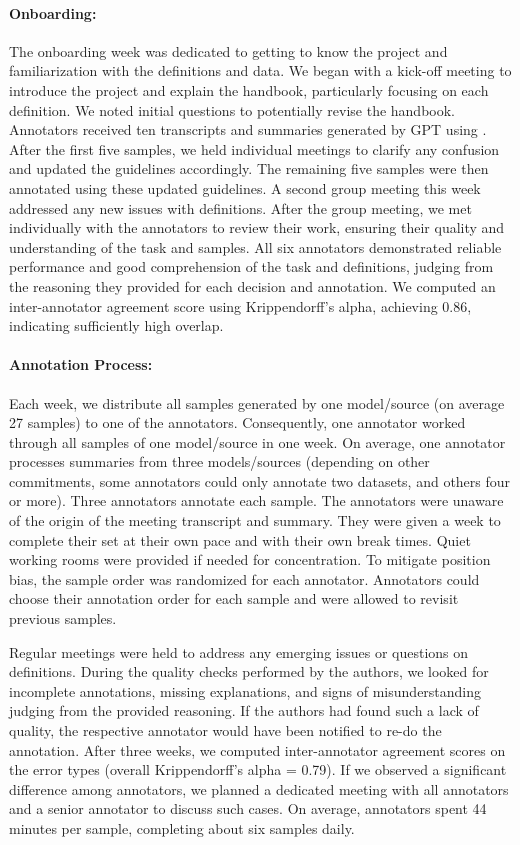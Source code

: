 \paragraph{Onboarding:}
The onboarding week was dedicated to getting to know the project and familiarization with the definitions and data.
We began with a kick-off meeting to introduce the project and explain the handbook, particularly focusing on each definition.
We noted initial questions to potentially revise the handbook. 
Annotators received ten transcripts and summaries generated by GPT \cite{OpenAIAAA24} using \pipeline{}.
After the first five samples, we held individual meetings to clarify any confusion and updated the guidelines accordingly.
The remaining five samples were then annotated using these updated guidelines. 
A second group meeting this week addressed any new issues with definitions.
After the group meeting, we met individually with the annotators to review their work, ensuring their quality and understanding of the task and samples. 
All six annotators demonstrated reliable performance and good comprehension of the task and definitions, judging from the reasoning they provided for each decision and annotation.
We computed an inter-annotator agreement score using Krippendorff's alpha, achieving 0.86, indicating sufficiently high overlap.

\paragraph{Annotation Process:}
Each week, we distribute all samples generated by one model/source (on average 27 samples) to one of the annotators. 
Consequently, one annotator worked through all samples of one model/source in one week.
On average, one annotator processes summaries from three models/sources (depending on other commitments, some annotators could only annotate two datasets, and others four or more).
Three annotators annotate each sample. 
The annotators were unaware of the origin of the meeting transcript and summary.
They were given a week to complete their set at their own pace and with their own break times. 
Quiet working rooms were provided if needed for concentration.
To mitigate position bias, the sample order was randomized for each annotator. 
Annotators could choose their annotation order for each sample and were allowed to revisit previous samples.

Regular meetings were held to address any emerging issues or questions on definitions. 
During the quality checks performed by the authors, we looked for incomplete annotations, missing explanations, and signs of misunderstanding judging from the provided reasoning. 
If the authors had found such a lack of quality, the respective annotator would have been notified to re-do the annotation.
After three weeks, we computed inter-annotator agreement scores on the error types (overall Krippendorff's alpha = 0.79). 
If we observed a significant difference among annotators, we planned a dedicated meeting with all annotators and a senior annotator to discuss such cases. 
On average, annotators spent 44 minutes per sample, completing about six samples daily.

